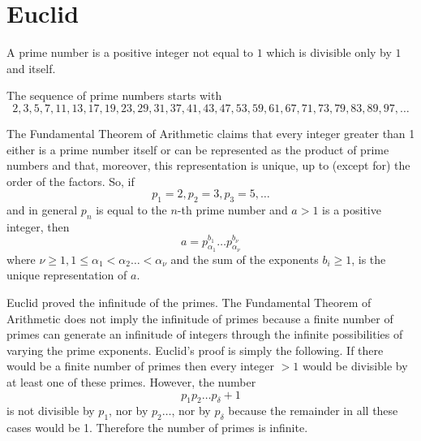 \section{Euclid}

A prime number is a positive integer not equal to $1$ which is divisible only by $1$ and itself.

The sequence of prime numbers starts with
$$2,3,5,7,11,13,17,19,23,29,31,37,41,43,47,53,59,61,67,71,73,79,83,89,97, \ldots$$

The Fundamental Theorem of Arithmetic claims that every integer greater than 1 either is a prime number itself or can be
represented as the product of prime numbers and that, moreover, this representation is unique, up to (except for) the
order of the factors. So, if
$$p_1=2, p_2=3, p_3=5, \ldots$$
and in general $p_n$ is equal to the $n$-th prime number and $a>1$ is a positive integer, then
$$a=p_{\alpha_1}^{b_1} \ldots p_{\alpha_\nu}^{b_\nu}$$
where $\nu \geq 1, 1 \leq \alpha_1 < \alpha_2 \ldots < \alpha_\nu$ and the sum of the exponents $b_i \geq 1$, is the
unique representation of $a$.

Euclid proved the infinitude of the primes. The Fundamental Theorem of Arithmetic does not imply the infinitude of
primes because a finite number of primes can generate an infinitude of integers through the infinite possibilities of
varying the prime exponents. Euclid's proof is simply the following. If there would be a finite number of primes then
every integer $>1$ would be divisible by at least one of these primes. However, the number
$$p_1 p_2 \ldots p_\delta + 1$$
is not divisible by $p_1$, nor by $p_2 \ldots$, nor by $p_\delta$ because the remainder in all these cases would be 1.
Therefore the number of primes is infinite.